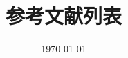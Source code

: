 \documentclass[12pt]{article}
\title{参考文献列表}
\author{}
\date{\today}
\begin{document}
\maketitle

\nocite{*}


\end{document}
